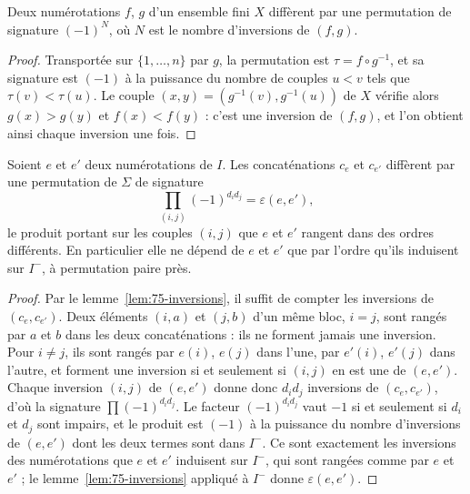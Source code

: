 \begin{lemme}\label{lem:75-inversions}
Deux numérotations $f$, $g$ d'un ensemble fini $X$ diffèrent par une permutation de signature $(-1)^N$, où $N$ est le nombre d'inversions de $(f, g)$.
\end{lemme}

\begin{proof}
Transportée sur $\{1, \ldots, n\}$ par $g$, la permutation est $\tau = f \circ g^{-1}$, et sa signature est $(-1)$ à la puissance du nombre de couples $u < v$ tels que $\tau(v) < \tau(u)$. Le couple $(x, y) = (g^{-1}(v), g^{-1}(u))$ de $X$ vérifie alors $g(x) > g(y)$ et $f(x) < f(y)$ : c'est une inversion de $(f, g)$, et l'on obtient ainsi chaque inversion une fois.
\end{proof}

\begin{encadre}
\begin{theoreme}\label{thm:75-signe}
Soient $e$ et $e'$ deux numérotations de $I$. Les concaténations $c_e$ et $c_{e'}$ diffèrent par une permutation de $\Sigma$ de signature
\[
\prod_{(i, j)} (-1)^{d_i d_j} = \varepsilon(e, e') ,
\]
le produit portant sur les couples $(i, j)$ que $e$ et $e'$ rangent dans des ordres différents. En particulier elle ne dépend de $e$ et $e'$ que par l'ordre qu'ils induisent sur $I^-$, à permutation paire près.
\end{theoreme}
\end{encadre}

\begin{proof}
Par le lemme~\ref{lem:75-inversions}, il suffit de compter les inversions de $(c_e, c_{e'})$. Deux éléments $(i, a)$ et $(j, b)$ d'un même bloc, $i = j$, sont rangés par $a$ et $b$ dans les deux concaténations : ils ne forment jamais une inversion. Pour $i \neq j$, ils sont rangés par $e(i)$, $e(j)$ dans l'une, par $e'(i)$, $e'(j)$ dans l'autre, et forment une inversion si et seulement si $(i, j)$ en est une de $(e, e')$. Chaque inversion $(i, j)$ de $(e, e')$ donne donc $d_i d_j$ inversions de $(c_e, c_{e'})$, d'où la signature $\prod (-1)^{d_i d_j}$. Le facteur $(-1)^{d_i d_j}$ vaut $-1$ si et seulement si $d_i$ et $d_j$ sont impairs, et le produit est $(-1)$ à la puissance du nombre d'inversions de $(e, e')$ dont les deux termes sont dans $I^-$. Ce sont exactement les inversions des numérotations que $e$ et $e'$ induisent sur $I^-$, qui sont rangées comme par $e$ et $e'$ ; le lemme~\ref{lem:75-inversions} appliqué à $I^-$ donne $\varepsilon(e, e')$.
\end{proof}

